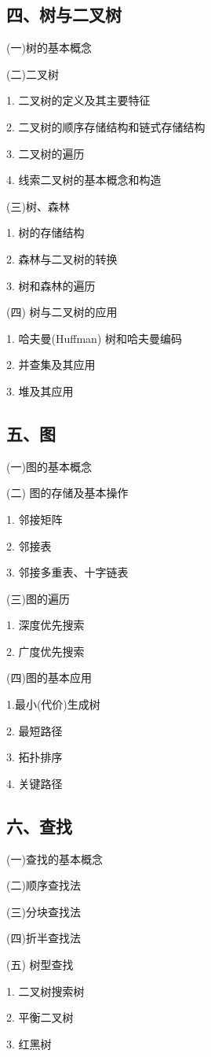 \documentclass[10pt]{article}
\begin{document}
\subsection*{四、树与二叉树}

(一)树的基本概念

(二)二叉树

1. 二叉树的定义及其主要特征

2. 二叉树的顺序存储结构和链式存储结构

3. 二叉树的遍历

{\color{red} 4. 线索二叉树的基本概念和构造}

{\color{red} (三)树、森林

1. 树的存储结构 

2. 森林与二叉树的转换 

3. 树和森林的遍历 }

(四) 树与二叉树的应用 

1. 哈夫曼(Huffman) 树和哈夫曼编码 

{\color{red}2. 并查集及其应用 

3. 堆及其应用}

\subsection*{五、图}

(一)图的基本概念

(二) 图的存储及基本操作

1. 邻接矩阵

2. 邻接表

{\color{red}3. 邻接多重表、十字链表}

(三)图的遍历

1. 深度优先搜索

2. 广度优先搜索

(四)图的基本应用

1.最小(代价)生成树

2. 最短路径

3. 拓扑排序

4. 关键路径

\subsection*{六、查找}

(一)查找的基本概念

(二)顺序查找法

{\color{red}(三)分块查找法}

(四)折半查找法

{\color{red}(五) 树型查找

1. 二叉树搜索树

2. 平衡二叉树

3. 红黑树}
\end{document}
